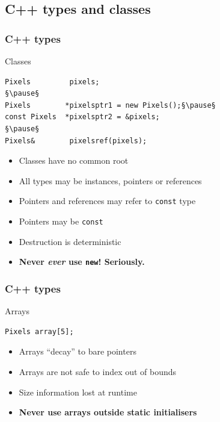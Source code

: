 \documentclass[handout]{beamer}
\begin{document}
\subsection{C++ types and classes}
\begin{frame}[fragile]
  \frametitle{C++ types}
  \begin{block}{Classes}
  \begin{lstlisting}
Pixels         pixels;
§\pause§
Pixels        *pixelsptr1 = new Pixels();§\pause§
const Pixels  *pixelsptr2 = &pixels;
§\pause§
Pixels&        pixelsref(pixels);
\end{lstlisting}
  \begin{itemize}
    \pause
  \item Classes have no common root
    \pause
  \item All types may be instances, pointers or references
    \pause
  \item Pointers and references may refer to \texttt{const} type
    \pause
  \item Pointers may be \texttt{const}
    \pause
  \item Destruction is deterministic
    \pause
  \item \textbf{Never \emph{ever} use \texttt{new}!  Seriously.}
  \end{itemize}
  \end{block}
\end{frame}

\begin{frame}[fragile]
  \frametitle{C++ types}
  \begin{block}{Arrays}
  \begin{lstlisting}
Pixels array[5];
\end{lstlisting}
  \begin{itemize}
    \pause
  \item Arrays “decay” to bare pointers
    \pause
  \item Arrays are not safe to index out of bounds
    \pause
  \item Size information lost at runtime
    \pause
  \item \textbf{Never use arrays outside static initialisers}
  \end{itemize}
  \end{block}
\end{frame}
\end{document}
